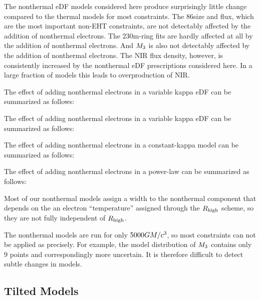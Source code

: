 The nonthermal eDF models considered here produce surprisingly little change compared to the thermal models for most constraints.  The 86\GHz size and flux, which are the most important non-EHT constraints, are not detectably affected by the addition of nonthermal electrons.  The 230\GHz m-ring fits are hardly affected at all by the addition of nonthermal electrons.  And $M_{3}$ is also not detectably affected by the addition of nonthermal electrons.  The NIR flux density, however, is consistently increased by the nonthermal eDF prescriptions considered here.  In a large fraction of models this leads to overproduction of NIR.


The effect of adding nonthermal electrons in a variable kappa eDF can be summarized as follows:

The effect of adding nonthermal electrons in a variable kappa eDF can be summarized as follows:

The effect of adding nonthermal electrons in a constant-kappa model can be summarized as follows:

The effect of adding nonthermal electrons in a power-law can be summarized as follows:

Most of our nonthermal models assign a width to the nonthermal component that depends on the an electron ``temperature'' assigned through the $R_\mathrm{high}$ scheme, so they are not fully independent of $R_\mathrm{high}$.

The nonthermal models are run for only $5000GM/c^3$, so most  constraints can not be applied as precisely.  For example, the model distribution of $M_{3}$ contains only $9$ points and correspondingly more uncertain.  It is therefore difficult to detect subtle changes in models.

\subsection{Tilted Models}

